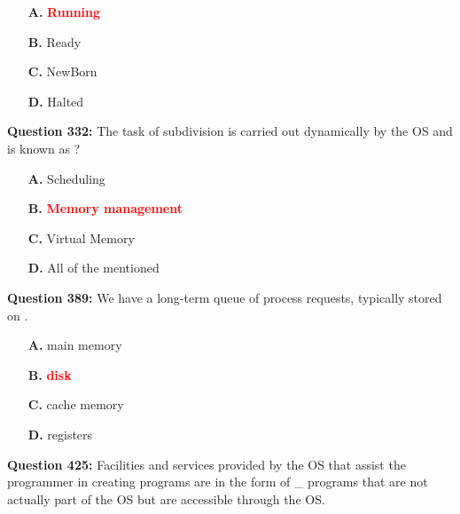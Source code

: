 \documentclass[12pt,a4paper]{article}
\begin{document}
\begin{itemize}
    \item[\textbf{A.}] \textcolor{red}{\textbf{Running}}
    \item[\textbf{B.}] Ready
    \item[\textbf{C.}] NewBorn
    \item[\textbf{D.}] Halted
\end{itemize}

\vspace{0.5cm}

\vspace{0.5cm}

\textbf{Question 332:} The task of subdivision is carried out dynamically by the OS and is known as\underline{\hspace{1.5cm}} ?

\begin{itemize}
    \item[\textbf{A.}] Scheduling
    \item[\textbf{B.}] \textcolor{red}{\textbf{Memory management}}
    \item[\textbf{C.}] Virtual Memory
    \item[\textbf{D.}] All of the mentioned
\end{itemize}

\vspace{0.5cm}

\vspace{0.5cm}

\textbf{Question 389:} We have a long-term queue of process requests, typically stored on \underline{\hspace{1.5cm}}.

\begin{itemize}
    \item[\textbf{A.}] main memory
    \item[\textbf{B.}] \textcolor{red}{\textbf{disk}}
    \item[\textbf{C.}] cache memory
    \item[\textbf{D.}] registers
\end{itemize}

\vspace{0.5cm}

\vspace{0.5cm}

\textbf{Question 425:} Facilities and services provided by the OS that assist the programmer in creating programs are in the form of \_ programs that are not actually part of the OS but are accessible through the OS.
\end{document}

